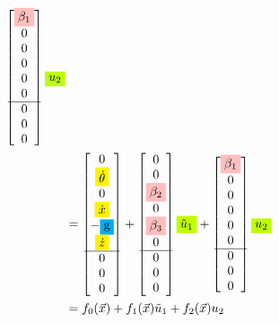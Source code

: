 \documentclass[12pt]{article}
\begin{document}
\begin{align*}
\begin{bmatrix}
            \colorbox{pink}{$\beta_1$} \\
            0 \\
            0 \\
            0 \\
            0 \\
            0 \\    
            \hline        
            0 \\
            0 \\
            0 \\
        \end{bmatrix} \colorbox{lime}{$u_2$} \\
    &= \begin{bmatrix}
        0 \\
        \colorbox{yellow}{$\dot{\theta}$} \\
        0 \\
        \colorbox{yellow}{$\dot{x}$} \\
        -\colorbox{cyan}{g} \\
        \colorbox{yellow}{$\dot{z}$} \\
        \hline
        0 \\
        0 \\
        0 \\
    \end{bmatrix} +  \begin{bmatrix}
        0 \\
        0 \\
        \colorbox{pink}{$\beta_2$} \\
        0 \\
        \colorbox{pink}{$\beta_3$} \\
        0 \\
        \hline
        0 \\
        0 \\
        0 \\
    \end{bmatrix} \colorbox{lime}{$\tilde{u}_1$} + \begin{bmatrix}
        \colorbox{pink}{$\beta_1$} \\
        0 \\
        0 \\
        0 \\
        0 \\
        0 \\ 
        \hline
        0 \\
        0 \\
        0 \\
    \end{bmatrix} \colorbox{lime}{$u_2$} \\
    &= f_0(\vec{x}) + f_1(\vec{x}) \tilde{u}_1 + f_2(\vec{x}) u_2
\end{align*}
\end{document}

